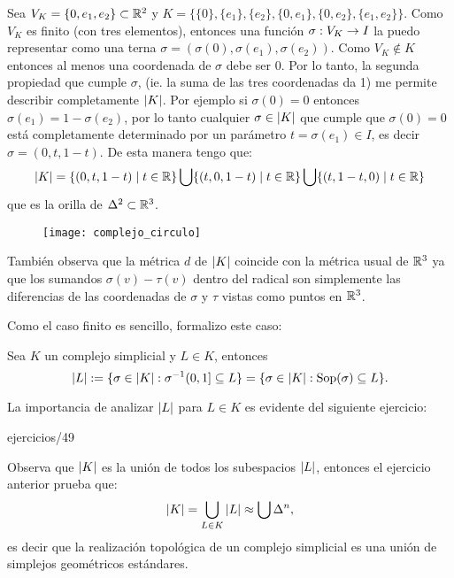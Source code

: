 \documentclass[../../topologia_algebraica]{subfiles}
\begin{document}
\begin{ejemplo}\label{ejemplo:complejo_circulo}
  Sea $V_K=\{0,e_1,e_2\}\subset\mathbb{R}^2$ y $K=\{\{0\},\{e_1\},\{e_2\},\{0,e_1\},\{0,e_2\},\{e_1,e_2\}\}$.
  Como $V_K$ es finito (con tres elementos), entonces una funci\'on $\sigma:V_K\rightarrow I$ la puedo
  representar como una terna $\sigma=(\sigma(0),\sigma(e_1),\sigma(e_2))$. Como $V_K\not\in K$ entonces
  al menos una coordenada de $\sigma$ debe ser 0. Por lo tanto, la segunda propiedad que cumple
  $\sigma$, (ie. la suma de las tres coordenadas da 1) me permite describir completamente $\left| K \right|$.
  Por ejemplo si $\sigma(0)=0$ entonces $\sigma(e_1)=1-\sigma(e_2)$, por lo tanto cualquier
  $\sigma\in\left| K \right|$ que cumple que $\sigma(0)=0$ est\'a completamente determinado por un par\'ametro
  $t=\sigma(e_1)\in I$, es decir $\sigma=(0,t,1-t)$. De esta manera tengo que:
  \[
    \left| K \right|=
    \{(0,t,1-t)\mid t\in\mathbb{R} \}\bigcup
    \{(t,0,1-t)\mid t\in\mathbb{R} \}\bigcup
    \{(t,1-t,0)\mid t\in\mathbb{R} \}
  \]
  que es la orilla de $\Delta^2\subset\mathbb{R}^3$. %
  \begin{figure}[h!]%
    \centering
    \texttt{[image: complejo\_circulo]}
  \end{figure}%
  Tambi\'en observa que la m\'etrica $d$ de $\left| K \right|$ coincide con la m\'etrica usual de $\mathbb{R}^3$
  ya que los sumandos $\sigma(v)-\tau(v)$ dentro del radical son simplemente las diferencias
  de las coordenadas de $\sigma$ y $\tau$ vistas como puntos en $\mathbb{R}^3$.
\end{ejemplo}

Como el caso finito es sencillo, formalizo este caso:

\begin{defin}
  Sea $K$ un complejo simplicial y $L\in K$, entonces
  \[
    \left| L \right|:=
    \{\sigma\in\left| K \right|:\sigma^{-1}(0,1]\subseteq L\}=
    \{\sigma\in \left| K \right|:\text{Sop}(\sigma)\subseteq L\}.
  \]
\end{defin}

La importancia de analizar $\left| L \right|$ para $L\in K$ es evidente del siguiente ejercicio:

{ejercicios/49} %

\begin{nota}
  Observa que $\left| K \right|$ es la uni\'on de todos los subespacios $\left| L \right|$, entonces el ejercicio
  anterior prueba que:
  \[
    \left| K \right|=\bigcup_{L\in K}\left| L \right|\approx \bigcup \Delta^n,
  \]
  es decir que la realizaci\'on topol\'ogica de un complejo simplicial es una uni\'on de simplejos
  geom\'etricos est\'andares.
\end{nota}
\end{document}
